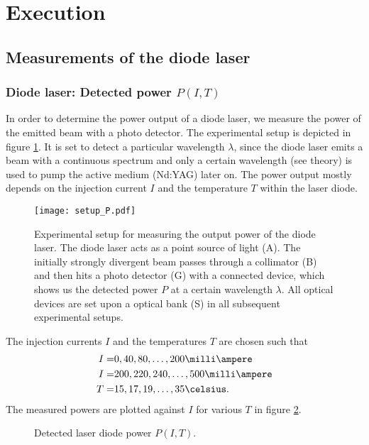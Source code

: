 
\section{Execution}
\subsection{Measurements of the diode laser}
\subsubsection{Diode laser: Detected power $P(I,T)$}
In order to determine the power output of a diode laser, we measure the power of the emitted beam with a photo detector. The experimental setup is depicted in figure \ref{fig:setup_P}. It is set to detect a particular wavelength $\lambda$, since the diode laser emits a beam with a continuous spectrum and only a certain wavelength (see theory) is used to pump the active medium (Nd:YAG) later on. The power output mostly depends on the injection current $I$ and the temperature $T$ within the laser diode.

\begin{figure}[h]
	\centering
	\texttt{[image: setup\_P.pdf]}
	\caption[Measurement of the diode laser power]{Experimental setup for measuring the output power of the diode laser. The diode laser acts as a point source of light (A). The initially strongly divergent beam passes through a collimator (B) and then hits a photo detector (G) with a connected device, which shows us the detected power $P$ at a certain wavelength $\lambda$. All optical devices are set upon a optical bank (S) in all subsequent experimental setups. \cite{lit:manual}}
	\label{fig:setup_P}
\end{figure}

The injection currents $I$ and the temperatures $T$ are chosen such that
\begin{align*}
I=&0,40,80,\dots,200\milli\ampere\\
I=&200,220,240,\dots,500\milli\ampere\\
T=&15,17,19,\dots,35\celsius.
\end{align*}
The measured powers are plotted against $I$ for various $T$ in figure \ref{fig:measurement_P}.

\begin{figure}[h]
	\centering
	
	\caption{Detected laser diode power $P(I,T)$.}
	\label{fig:measurement_P}
\end{figure}

